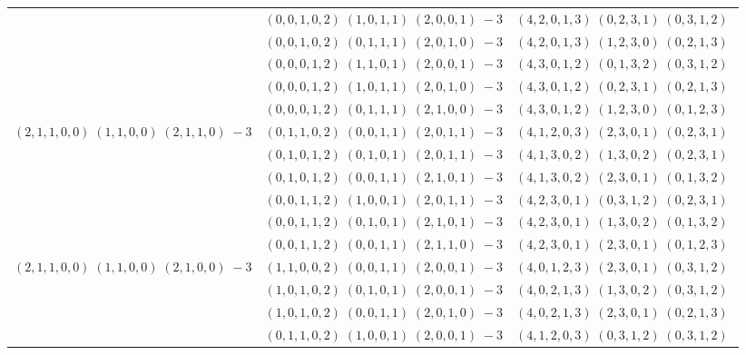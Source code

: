 \documentclass[11pt]{article}
\begin{document}
\begin{longtable}[l]{|c|c|c|}
 \cline{2-3} 
 & $(0 ,0 ,1 ,0 ,2) \;(1 ,0 ,1 ,1) \;(2 ,0 ,0 ,1) \;-3$ & $(4 ,2 ,0 ,1 ,3) \;(0 ,2 ,3 ,1) \;(0 ,3 ,1 ,2) \;$\\ 
 \cline{2-3} 
 & $(0 ,0 ,1 ,0 ,2) \;(0 ,1 ,1 ,1) \;(2 ,0 ,1 ,0) \;-3$ & $(4 ,2 ,0 ,1 ,3) \;(1 ,2 ,3 ,0) \;(0 ,2 ,1 ,3) \;$\\ 
 \cline{2-3} 
 & $(0 ,0 ,0 ,1 ,2) \;(1 ,1 ,0 ,1) \;(2 ,0 ,0 ,1) \;-3$ & $(4 ,3 ,0 ,1 ,2) \;(0 ,1 ,3 ,2) \;(0 ,3 ,1 ,2) \;$\\ 
 \cline{2-3} 
 & $(0 ,0 ,0 ,1 ,2) \;(1 ,0 ,1 ,1) \;(2 ,0 ,1 ,0) \;-3$ & $(4 ,3 ,0 ,1 ,2) \;(0 ,2 ,3 ,1) \;(0 ,2 ,1 ,3) \;$\\ 
 \cline{2-3} 
 & $(0 ,0 ,0 ,1 ,2) \;(0 ,1 ,1 ,1) \;(2 ,1 ,0 ,0) \;-3$ & $(4 ,3 ,0 ,1 ,2) \;(1 ,2 ,3 ,0) \;(0 ,1 ,2 ,3) \;$\\ \hline\multirow[t]{6}{*}{ $(2 ,1 ,1 ,0 ,0) \;(1 ,1 ,0 ,0) \;(2 ,1 ,1 ,0) \;-3$ }  & $(0 ,1 ,1 ,0 ,2) \;(0 ,0 ,1 ,1) \;(2 ,0 ,1 ,1) \;-3$ & $(4 ,1 ,2 ,0 ,3) \;(2 ,3 ,0 ,1) \;(0 ,2 ,3 ,1) \;$\\ 
 \cline{2-3} 
 & $(0 ,1 ,0 ,1 ,2) \;(0 ,1 ,0 ,1) \;(2 ,0 ,1 ,1) \;-3$ & $(4 ,1 ,3 ,0 ,2) \;(1 ,3 ,0 ,2) \;(0 ,2 ,3 ,1) \;$\\ 
 \cline{2-3} 
 & $(0 ,1 ,0 ,1 ,2) \;(0 ,0 ,1 ,1) \;(2 ,1 ,0 ,1) \;-3$ & $(4 ,1 ,3 ,0 ,2) \;(2 ,3 ,0 ,1) \;(0 ,1 ,3 ,2) \;$\\ 
 \cline{2-3} 
 & $(0 ,0 ,1 ,1 ,2) \;(1 ,0 ,0 ,1) \;(2 ,0 ,1 ,1) \;-3$ & $(4 ,2 ,3 ,0 ,1) \;(0 ,3 ,1 ,2) \;(0 ,2 ,3 ,1) \;$\\ 
 \cline{2-3} 
 & $(0 ,0 ,1 ,1 ,2) \;(0 ,1 ,0 ,1) \;(2 ,1 ,0 ,1) \;-3$ & $(4 ,2 ,3 ,0 ,1) \;(1 ,3 ,0 ,2) \;(0 ,1 ,3 ,2) \;$\\ 
 \cline{2-3} 
 & $(0 ,0 ,1 ,1 ,2) \;(0 ,0 ,1 ,1) \;(2 ,1 ,1 ,0) \;-3$ & $(4 ,2 ,3 ,0 ,1) \;(2 ,3 ,0 ,1) \;(0 ,1 ,2 ,3) \;$\\ \hline\multirow[t]{15}{*}{ $(2 ,1 ,1 ,0 ,0) \;(1 ,1 ,0 ,0) \;(2 ,1 ,0 ,0) \;-3$ }  & $(1 ,1 ,0 ,0 ,2) \;(0 ,0 ,1 ,1) \;(2 ,0 ,0 ,1) \;-3$ & $(4 ,0 ,1 ,2 ,3) \;(2 ,3 ,0 ,1) \;(0 ,3 ,1 ,2) \;$\\ 
 \cline{2-3} 
 & $(1 ,0 ,1 ,0 ,2) \;(0 ,1 ,0 ,1) \;(2 ,0 ,0 ,1) \;-3$ & $(4 ,0 ,2 ,1 ,3) \;(1 ,3 ,0 ,2) \;(0 ,3 ,1 ,2) \;$\\ 
 \cline{2-3} 
 & $(1 ,0 ,1 ,0 ,2) \;(0 ,0 ,1 ,1) \;(2 ,0 ,1 ,0) \;-3$ & $(4 ,0 ,2 ,1 ,3) \;(2 ,3 ,0 ,1) \;(0 ,2 ,1 ,3) \;$\\ 
 \cline{2-3} 
 & $(0 ,1 ,1 ,0 ,2) \;(1 ,0 ,0 ,1) \;(2 ,0 ,0 ,1) \;-3$ & $(4 ,1 ,2 ,0 ,3) \;(0 ,3 ,1 ,2) \;(0 ,3 ,1 ,2) \;$\\ 

\end{longtable}
\end{document}
